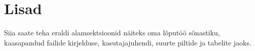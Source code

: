 \section*{Lisad} \label{lisad} 
Siia saate teha eraldi alamsektsioonid näiteks oma lõputöö sõnastiku, kaasapandud failide kirjelduse, kasutajajuhendi, suurte piltide ja tabelite jaoks.